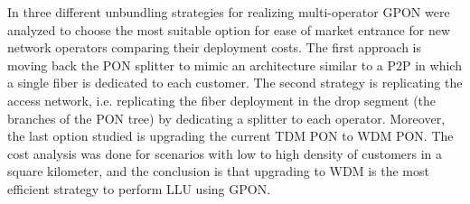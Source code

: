 In \cite{6381701} three different unbundling strategies for realizing multi-operator \ac{GPON} were analyzed to choose the most suitable option for ease of market entrance for new network operators comparing their deployment costs. The first approach is moving back the \ac{PON} splitter to mimic an architecture similar to a P2P in which a single fiber is dedicated to each customer. The second strategy is replicating the access network, i.e. replicating the fiber deployment in the drop segment (the branches of the \ac{PON} tree) by dedicating a splitter to each operator. Moreover, the last option studied is upgrading the current TDM \ac{PON} to WDM PON. The cost analysis was done for scenarios with low to high density of customers in a square kilometer, and the conclusion is that upgrading to WDM is the most efficient strategy to perform LLU using \ac{GPON}.

